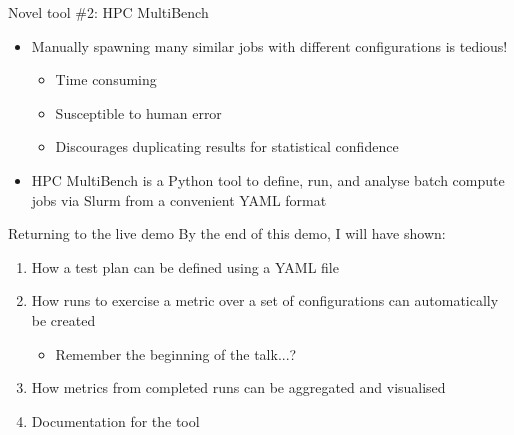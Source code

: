 \documentclass[10pt,aspectratio=169]{beamer}
\begin{document}
\begin{frame}{Novel tool \#2: HPC MultiBench}
    \begin{itemize}
        \item<1-> Manually spawning many similar jobs with different configurations is tedious!
        \begin{itemize}
            \item Time consuming
            \item Susceptible to human error
            \item Discourages duplicating results for statistical confidence
        \end{itemize}
        \vspace{0.5cm}
        \item<2-> HPC MultiBench is a Python tool to define, run, and analyse batch compute jobs via Slurm from a convenient YAML format
    \end{itemize}
\end{frame}

\begin{frame}{Returning to the live demo}
    By the end of this demo, I will have shown:
    \begin{enumerate}
        \item <1-> How a test plan can be defined using a YAML file
        \item <2-> How runs to exercise a metric over a set of configurations can automatically be created
        \begin{itemize}
            \item Remember the beginning of the talk...?
        \end{itemize}
        \item <3-> How metrics from completed runs can be aggregated and visualised
        \item <4-> Documentation for the tool
    \end{enumerate}
\end{frame}









\end{document}
